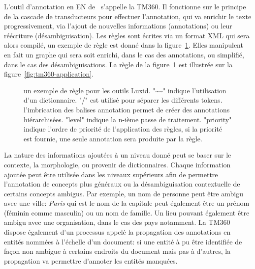 \documentclass[citation\_needed]{subfiles}
\begin{document}
L'outil d'annotation en EN de \Luxid\ s'appelle la TM360. Il fonctionne sur le principe de la cascade de transducteurs pour effectuer l'annotation, qui va enrichir le texte progressivement, via l'ajout de nouvelles informations (annotations) ou leur réécriture (désambiguisation). Les règles sont écrites via un format XML qui sera alors compilé, un exemple de règle est donné dans la figure\ \ref{fig:tm360-rule}. Elles manipulent en fait un graphe qui sera soit enrichi, dans le cas des annotations, ou simplifié, dans le cas des désambiguisations. La règle de la figure\ \ref{fig:tm360-rule} est illustrée sur la figure\ \ref{fig:tm360-application}.

\begin{figure}[ht!]
\begin{xml}
\end{xml}
\caption{un exemple de règle pour les outils Luxid. "\~{}\~{}" indique l'utilisation d'un dictionnaire. "/" est utilisé pour séparer les différents tokens. l'imbrication des balises annotation permet de créer des annotations hiérarchisées. "level" indique la n-ième passe de traitement. "priority" indique l'ordre de priorité de l'application des règles, si la priorité est fournie, une seule annotation sera produite par la règle.}
\label{fig:tm360-rule}
\end{figure}

La nature des informations ajoutées à un niveau donné peut se baser sur le contexte, la morphologie, ou provenir de dictionnaires. Chaque information ajoutée peut être utilisée dans les niveaux supérieurs afin de permettre l'annotation de concepts plus généraux ou la désambiguisation contextuelle de certains concepts ambigus. Par exemple, un nom de personne peut être ambigu avec une ville: \emph{Paris} qui est le nom de la capitale peut également être un prénom (féminin comme masculin) ou un nom de famille. Un lieu pouvant également être ambigu avec une organisation, dans le cas des pays notamment. La TM360 dispose également d'un processus appelé la propagation des annotations en entités nommées à l'échelle d'un document: si une entité à pu être identifiée de façon non ambigue à certains endroits du document mais pas à d'autres, la propagation va permettre d'annoter les entités manquées.
\end{document}
